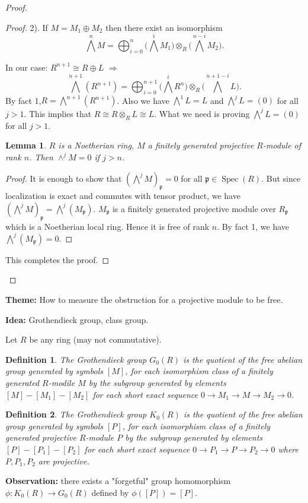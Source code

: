 \documentclass[cs4size]{article}
\newcommand{\frp}{\mathfrak{p}}
\newcommand{\ra}{\rightarrow}
\newcommand{\Ra}{\Rightarrow}
\DeclareMathOperator{\Spec}{Spec}
\newtheorem{definition}{Definition}
\newtheorem{lem}{Lemma}
\begin{document}
\begin{proof}
\begin{proof}
2). If $M=M_1\oplus M_2$ then there exist an isomorphism
\[\bigwedge^n M=\bigoplus_{i=0}^n\bigg(\bigwedge^iM_1\bigg)\otimes_R\bigg(\bigwedge^{n-i}M_2\bigg).\]

In our case: $R^{n+1}\cong R\oplus L$ $\Ra$ \[\bigwedge^{n+1}(R^{n+1})=\bigoplus_{i=0}^{n+1}\bigg(\bigwedge^iR^n\bigg)\otimes_R\bigg(\bigwedge^{n+1-i}L\bigg).\]
By fact 1,$R=\bigwedge^{n+1}(R^{n+1})$. Also we have $\bigwedge^1L=L$ and $\bigwedge^jL=(0)$ for all $j>1$. This implies that $R\cong R\otimes_RL\cong L$. What we need is proving $\bigwedge^j L=(0)$ for all $j>1$.
\begin{lem}
$R$ is a Noetherian ring, $M$ a finitely generated projective $R$-module of rank $n$. Then $\wedge^jM=0$ if $j>n$.
\end{lem}
\begin{proof}
It is enough to show that $(\bigwedge^jM)_\frp=0$ for all $\frp\in\Spec(R)$. But since localization is exact and commutes with tensor product, we have $(\bigwedge^jM)_\frp=\bigwedge^j(M_\frp)$. $M_\frp$ is a finitely generated projective module over $R_\frp$ which is a Noetherian local ring. Hence it is free of rank $n$. By fact 1, we have $\bigwedge^j(M_\frp)=0$.
\end{proof}
This completes the proof.
\end{proof}
\end{proof}

\textbf{Theme:} How to measure the obstruction for a projective module to be free.

\textbf{Idea:} Grothendieck group, class group.

Let $R$ be any ring (may not commutative).
\begin{definition}
The Grothendieck group $G_0(R)$ is the quotient of the free abelian group generated by symbols $[M]$, for each isomorphism class of a finitely generated $R$-modile $M$ by the subgroup generated by elements $[M]-[M_1]-[M_2]$ for each short exact sequence $0\ra M_1\ra M\ra M_2\ra 0$.
\end{definition}
\begin{definition}
The Grothendieck group $K_0(R)$ is the quotient of the free abelian group generated by symbols $[P]$, for each isomorphism class of a finitely generated projective $R$-module $P$ by the subgroup generated by elements $[P]-[P_1]-[P_2]$ for each short exact sequence $0\ra P_1\ra P\ra P_2\ra 0$ where $P,P_1,P_2$ are projective.
\end{definition}

\textbf{Observation:} there exists a "forgetful" group homomorphism $\phi: K_0(R)\ra G_0(R)$ defined by $\phi([P])=[P]$.
\end{document}

